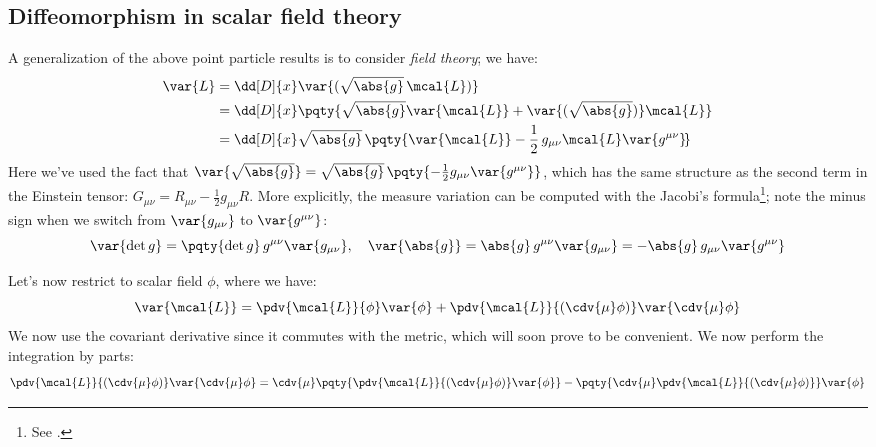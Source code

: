 \documentclass[a4paper
	,10pt
]{article}
\begin{document}
\subsection{Diffeomorphism in scalar field theory}
	A generalization of the above point particle results is to consider \textit{field theory}; we have:
	\begin{equation}
	\begin{aligned}
		\var{L}
		&= \dd[D]{x} \var{(\sqrt{\abs{g}}\,\mcal{L})} \\
		&= \dd[D]{x} \pqty{
				\sqrt{\abs{g}} \var{\mcal{L}}
				+ \var{(\sqrt{\abs{g}})} \mcal{L}
			} \\
		&= \dd[D]{x} \sqrt{\abs{g}}\,\pqty{
				\var{\mcal{L}}
				- \frac{1}{2}\,
					g_{\mu\nu} \mcal{L}
					\var{g^{\mu\nu}} \!
			} \\
	\end{aligned}
	\label{eq:Lagrangian_form_to_density}
	\end{equation}
	Here we've used the fact that $
		\var{\sqrt{\abs{g}}}
		= \sqrt{\abs{g}}\,\pqty{
			- \frac{1}{2} g_{\mu\nu} \var{g^{\mu\nu}}
		}
	$, which has the same structure as the second term in the Einstein tensor: $
		G_{\mu\nu}
		= R_{\mu\nu} - \frac{1}{2} g_{\mu\nu} R
	$. More explicitly, the measure variation can be computed with the Jacobi's formula\footnote{
		See . 
	}; note the minus sign when we switch from $\var{g_{\mu\nu}}$ to $\var{g^{\mu\nu}}$:
	\begin{equation}
		\var{\det g}
		= \pqty{\det g}\,g^{\mu\nu} \var{g_{\mu\nu}},
	\quad
		\var{\abs{g}}
		= \abs{g}\,g^{\mu\nu} \var{g_{\mu\nu}}
		= - \abs{g}\,g_{\mu\nu} \var{g^{\mu\nu}}
	\label{eq:measure_variation}
	\end{equation}
	
	Let's now restrict to scalar field $\phi$, where we have:
	\begin{equation}
		\var{\mcal{L}}
		= \pdv{\mcal{L}}{\phi} \var{\phi}
			+ \pdv{\mcal{L}}{(\cdv{\mu} \phi)}
				\var{\cdv{\mu}\phi}
	\end{equation}
	We now use the covariant derivative since it commutes with the metric, which will soon prove to be convenient. We now perform the integration by parts:
	\begin{equation}
		\pdv{\mcal{L}}{(\cdv{\mu} \phi)}
			\var{\cdv{\mu}\phi}
		= \cdv{\mu} \pqty{
				\pdv{\mcal{L}}{(\cdv{\mu} \phi)}
				\var{\phi}
			}
		- \pqty{
				\cdv{\mu}
				\pdv{\mcal{L}}{(\cdv{\mu} \phi)}
			} \var{\phi}
	\label{eq:integrate_by_parts}
	\end{equation}
	
\end{document}
